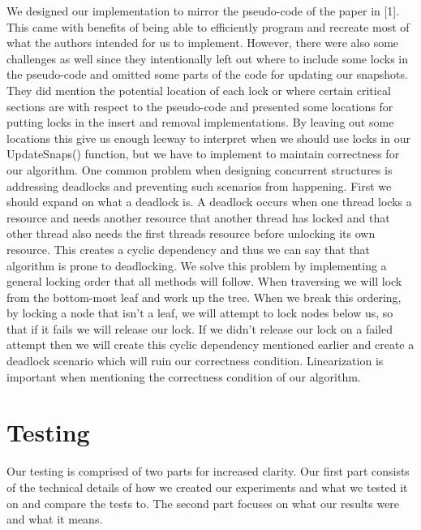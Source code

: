 \documentclass[conference]{IEEEtran}
\begin{document}
We designed our implementation to mirror the pseudo-code of the paper in [1]. This came with benefits of being able to efficiently program and recreate most of what the authors intended for us to implement. However, there were also some challenges as well since they intentionally left out where to include some locks in the pseudo-code and omitted some parts of the code for updating our snapshots. They did mention the potential location of each lock or where certain critical sections are with respect to the pseudo-code and presented some locations for putting locks in the insert and removal implementations. By leaving out some locations this give us enough leeway to interpret when we should use locks in our UpdateSnaps() function, but we have to implement to maintain correctness for our algorithm.
	One common problem when designing concurrent structures is addressing deadlocks and preventing such scenarios from happening. First we should expand on what a deadlock is. A deadlock occurs when one thread locks a resource and needs another resource that another thread has locked and that other thread also needs the first threads resource before unlocking its own resource. This creates a cyclic dependency and thus we can say that that algorithm is prone to deadlocking. We solve this problem by implementing a general locking order that all methods will follow. When traversing we will lock from the bottom-most leaf and work up the tree. When we break this ordering, by locking a node that isn't a leaf, we will attempt to lock nodes below us, so that if it fails we will release our lock. If we didn't release our lock on a failed attempt then we will create this cyclic dependency mentioned earlier and create a deadlock scenario which will ruin our correctness condition.
	Linearization is important when mentioning the correctness condition of our algorithm.

\section{Testing}

Our testing is comprised of two parts for increased clarity. Our first part consists of the technical details of how we created our experiments and what we tested it on and compare the tests to. The second part focuses on what our results were and what it means.
\end{document}
